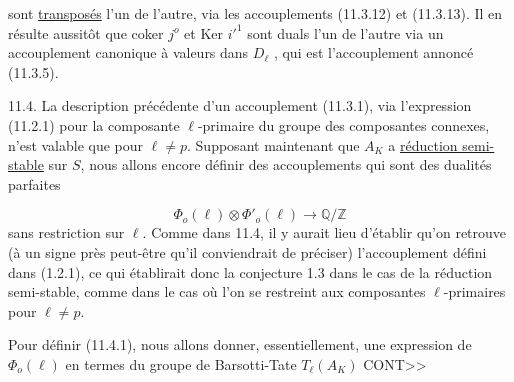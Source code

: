 \begin{center}
\end{center}
sont \underline{transposés} l'un de l'autre, via les accouplements (11.3.12) et (11.3.13). Il en résulte aussitôt que coker $j^o$ et Ker ${i'}^{1}$ sont duals l'un de l'autre via un accouplement canonique à valeurs dans $D_\ell$ , qui est l'accouplement annoncé (11.3.5).

11.4.  La description précédente d'un accouplement (11.3.1), via l'expression (11.2.1) pour la composante $\ell$-primaire du groupe des composantes connexes, n'est valable que pour $\ell \neq p$. Supposant maintenant que $A_K$ a \underline{réduction semi-stable} sur $S$, nous allons encore définir des accouplements qui sont des dualités parfaites

\begin{equation}\tag{11.4.1}
\Phi_o(\ell) \otimes \Phi'_o(\ell) \longrightarrow \mathbb{Q}/\mathbb{Z}
\end{equation}
sans restriction sur $\ell$. Comme dans 11.4, il y aurait lieu d'établir qu'on retrouve (à un signe près peut-être qu'il conviendrait de préciser) l'accouplement défini dans (1.2.1), ce qui établirait donc la conjecture 1.3 dans le cas de la réduction semi-stable, comme dans le cas où l'on se restreint aux composantes $\ell$-primaires pour $\ell \neq p$.

Pour définir (11.4.1), nous allons donner, essentiellement, une expression de $\Phi_o(\ell)$ en termes du groupe de Barsotti-Tate $T_\ell(A_K)$ CONT>>


